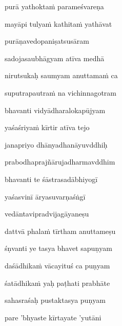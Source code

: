 \nemslokab 
purā yathokta\.m parameśvareṇa \danda\dontdisplaylinenum

\nemslokac 
mayāpi tulya\.m kathita\.m yathāvat
\dontdisplaylinenum

\nemslokad 
purāṇavedopaniṣatsusāram \veg\dontdisplaylinenum

\ujvers\nemsloka 
sadojasaubhāgyam atīva medhā
\dontdisplaylinenum

\nemslokab 
nirutsukaḥ saumyam anuttama\.m ca \danda\dontdisplaylinenum

\nemslokac 
suputrapautra\.m na vichinnagotram
\dontdisplaylinenum

\nemslokad 
bhavanti vidyādharalokapūjyam \veg\dontdisplaylinenum

\ujvers\nemsloka 
yaśaśriya\.m kīrtir atīva tejo
\dontdisplaylinenum

\nemslokab 
janapriyo dhānyadhanāyuvddhiḥ \danda\dontdisplaylinenum

\nemslokac 
prabodhaprajñārujadharmavddhim
\dontdisplaylinenum

\nemslokad 
bhavanti te śāstrasadābhiyogī \veg\dontdisplaylinenum

\ujvers\nemsloka 
yaśasvinī āryasuvarṇaśṅgī
\dontdisplaylinenum

\nemslokab 
vedāntavipradvijagāyaneṣu \danda\dontdisplaylinenum

\nemslokac 
dattvā phala\.m tīrtham anuttameṣu
\dontdisplaylinenum

\nemslokad 
śṇvanti ye tasya bhavet sapuṇyam \veg\dontdisplaylinenum

\ujvers\nemsloka 
daśādhika\.m vācayituś ca puṇyam
\dontdisplaylinenum

\nemslokab 
śatādhika\.m yaḥ paṭhati prabhāte \danda\dontdisplaylinenum

\nemslokac 
sahasraśaḥ pustaktasya puṇyam
\dontdisplaylinenum

\nemslokad 
pare 'bhyaste kīrtayate 'yutāni \veg\dontdisplaylinenum

